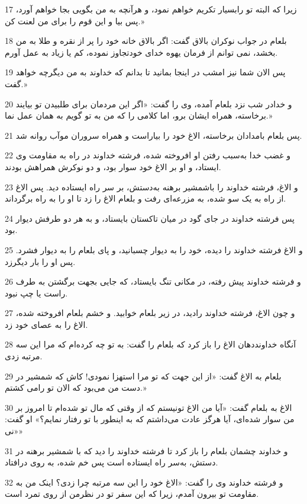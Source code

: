 \par 17 زیرا که البته تو رابسیار تکریم خواهم نمود، و هر‌آنچه به من بگویی بجا خواهم آورد، پس بیا و این قوم را برای من لعنت کن.»
\par 18 بلعام در جواب نوکران بالاق گفت: اگر بالاق خانه خود را پر از نقره و طلا به من بخشد، نمی توانم از فرمان یهوه خدای خودتجاوز نموده، کم یا زیاد به عمل آورم.
\par 19 پس الان شما نیز امشب در اینجا بمانید تا بدانم که خداوند به من دیگر‌چه خواهد گفت.»
\par 20 و خدادر شب نزد بلعام آمده، وی را گفت: «اگر این مردمان برای طلبیدن تو بیایند برخاسته، همراه ایشان برو، اما کلامی را که من به تو گویم به همان عمل نما.»
\par 21 پس بلعام بامدادان برخاسته، الاغ خود را بیاراست و همراه سروران موآب روانه شد.
\par 22 و غضب خدا به‌سبب رفتن او افروخته شده، فرشته خداوند در راه به مقاومت وی ایستاد، و او بر الاغ خود سوار بود، و دو نوکرش همراهش بودند.
\par 23 و الاغ، فرشته خداوند را باشمشیر برهنه به‌دستش، بر سر راه ایستاده دید. پس الاغ از راه به یک سو شده، به مزرعه‌ای رفت و بلعام الاغ را زد تا او را به راه برگرداند.
\par 24 پس فرشته خداوند در جای گود در میان تاکستان بایستاد، و به هر دو طرفش دیوار بود.
\par 25 و الاغ فرشته خداوند را دیده، خود را به دیوار چسبانید، و پای بلعام را به دیوار فشرد. پس او را بار دیگرزد.
\par 26 و فرشته خداوند پیش رفته، در مکانی تنگ بایستاد، که جایی بجهت برگشتن به طرف راست یا چپ نبود.
\par 27 و چون الاغ، فرشته خداوند رادید، در زیر بلعام خوابید. و خشم بلعام افروخته شده، الاغ را به عصای خود زد.
\par 28 آنگاه خداونددهان الاغ را باز کرد که بلعام را گفت: به تو چه کرده‌ام که مرا این سه مرتبه زدی.
\par 29 بلعام به الاغ گفت: «از این جهت که تو مرا استهزا نمودی! کاش که شمشیر در دست من می‌بود که الان تو رامی کشتم.»
\par 30 الاغ به بلعام گفت: «آیا من الاغ تونیستم که از وقتی که مال تو شده‌ام تا امروز بر من سوار شده‌ای، آیا هرگز عادت می‌داشتم که به اینطور با تو رفتار نمایم؟» او گفت: «نی»
\par 31 و خداوند چشمان بلعام را باز کرد تا فرشته خداوند را دید که با شمشیر برهنه در دستش، به‌سر راه ایستاده است پس خم شده، به روی درافتاد.
\par 32 و فرشته خداوند وی را گفت: «الاغ خود را این سه مرتبه چرا زدی؟ اینک من به مقاومت تو بیرون آمدم، زیرا که این سفر تو در نظرمن از روی تمرد است.
